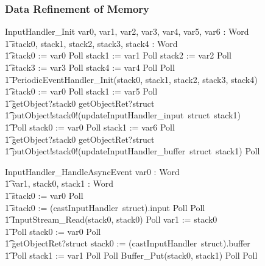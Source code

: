 \documentclass{beamer}
\begin{document}
\begin{frame}[shrink]
  \frametitle{Data Refinement of Memory}
  \setlength{\zedleftsep}{0cm}
  \setlength{\zedindent}{0cm}
  \begin{circus}
    InputHandler\_Init \circdef \circval var0, var1, var2, var3, var4, var5, var6 : Word  \circspot \\
    \t1 \circvar stack0, stack1, stack2, stack3, stack4 : Word \circspot \\
    \t1 stack0 := var0 \circseq Poll \circseq stack1 := var1 \circseq Poll \circseq stack2 := var2 \circseq Poll \circseq \\
    \t1 stack3 := var3 \circseq Poll \circseq stack4 := var4 \circseq Poll \circseq Poll \circseq \\
    \t1 PeriodicEventHandler\_Init(stack0, stack1, stack2, stack3, stack4) \circseq \\
    \t1 stack0 := var0 \circseq Poll \circseq stack1 := var5 \circseq Poll \circseq \\
    \t1 {\color{red} getObject?stack0 \then getObjectRet?struct \then {}} \\
    \t1 {\color{red} putObject!stack0!(updateInputHandler\_input~struct~stack1)  \then {}  \Skip} \circseq \\
    \t1 Poll \circseq stack0 := var0 \circseq Poll \circseq stack1 := var6 \circseq Poll \circseq \\
    \t1 {\color{red} getObject?stack0 \then getObjectRet?struct \then {}} \\
    \t1 {\color{red} putObject!stack0!(updateInputHandler\_buffer~struct~stack1) \then \Skip} \circseq Poll
  \end{circus}
  \begin{circus}
    InputHandler\_HandleAsyncEvent \circdef \circval var0 : Word \circspot \\
    \t1 \circvar var1, stack0, stack1 : Word \circspot \\
    \t1 stack0 := var0 \circseq Poll  \\
    \t1 {\color{red} stack0 := (castInputHandler~struct).input} \circseq Poll \circseq Poll \circseq \\
    \t1 InputStream\_Read(stack0, stack0) \circseq Poll \circseq var1 := stack0 \circseq \\
    \t1 Poll \circseq stack0 := var0 \circseq Poll  \\
    \t1 {\color{red} getObjectRet?struct \then stack0 := (castInputHandler~struct).buffer} \circseq \\
    \t1 Poll \circseq stack1 := var1 \circseq Poll \circseq Poll \circseq Buffer\_Put(stack0, stack1) \circseq Poll \circseq Poll
  \end{circus}
\end{frame}
\end{document}
